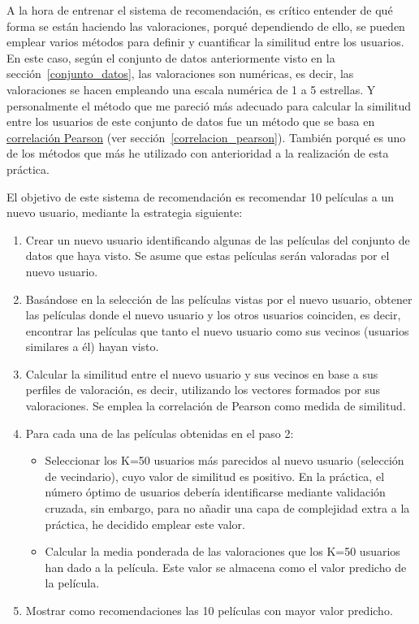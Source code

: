 \documentclass{uimppracticas}
\begin{document}
A la hora de entrenar el sistema de recomendación, es crítico entender de qué forma se están haciendo las valoraciones, porqué dependiendo de ello, se pueden emplear varios métodos para definir y cuantificar la similitud entre los usuarios. En este caso, según el conjunto de datos anteriormente visto en la sección~\ref{conjunto_datos}, las valoraciones son numéricas, es decir, las valoraciones se hacen empleando una escala numérica de 1 a 5 estrellas. Y personalmente el método que me pareció más adecuado para calcular la similitud entre los usuarios de este conjunto de datos fue un método que se basa en \href{https://es.wikipedia.org/wiki/Coeficiente_de_correlaci\%C3\%B3n_de_Pearson}{correlación Pearson} (ver sección~\ref{correlacion_pearson}). También porqué es uno de los métodos que más he utilizado con anterioridad a la realización de esta práctica.

El objetivo de este sistema de recomendación es recomendar 10 películas a un nuevo usuario, mediante la estrategia siguiente:

\begin{enumerate}
	\item Crear un nuevo usuario identificando algunas de las películas del conjunto de datos que haya visto. Se asume que estas películas serán valoradas por el nuevo usuario.
	\item Basándose en la selección de las películas vistas por el nuevo usuario, obtener las películas donde el nuevo usuario y los otros usuarios coinciden, es decir, encontrar las películas que tanto el nuevo usuario como sus vecinos (usuarios similares a él) hayan visto.
	\item Calcular la similitud entre el nuevo usuario y sus vecinos en base a sus perfiles de valoración, es decir, utilizando los vectores formados por sus valoraciones. Se emplea la correlación de Pearson como medida de similitud.
	\item Para cada una de las películas obtenidas en el paso 2:
		\begin{itemize}
			\item Seleccionar los K=50 usuarios más parecidos al nuevo usuario (selección de vecindario), cuyo valor de similitud es positivo. En la práctica, el número óptimo de usuarios debería identificarse mediante validación cruzada, sin embargo, para no añadir una capa de complejidad extra a la práctica, he decidido emplear este valor.
			\item Calcular la media ponderada de las valoraciones que los K=50 usuarios han dado a la película. Este valor se almacena como el valor predicho de la película.
		\end{itemize}	
	\item Mostrar como recomendaciones las 10 películas con mayor valor predicho.
\end{enumerate}
\end{document}
